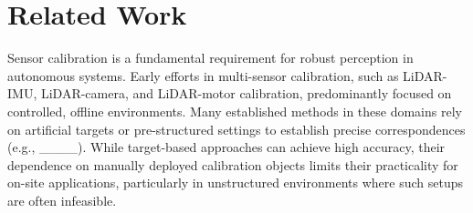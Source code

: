 \section{Related Work}

Sensor calibration is a fundamental requirement for robust perception in autonomous systems. Early efforts in multi-sensor calibration, such as LiDAR-IMU, LiDAR-camera, and LiDAR-motor calibration, predominantly focused on controlled, offline environments. Many established methods in these domains rely on artificial targets or pre-structured settings to establish precise correspondences (e.g., ____). While target-based approaches can achieve high accuracy, their dependence on manually deployed calibration objects limits their practicality for on-site applications, particularly in unstructured environments where such setups are often infeasible.


